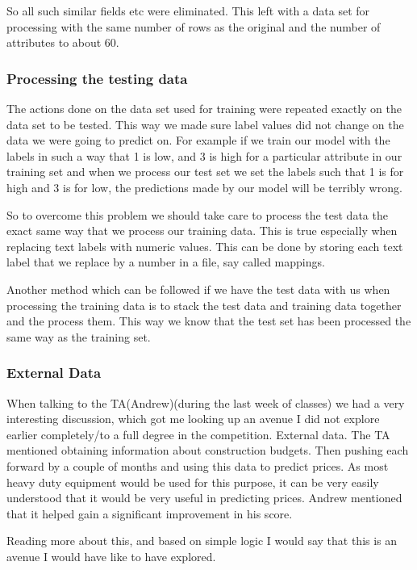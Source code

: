 \documentclass[paper=a4, fontsize=11pt]{scrartcl}	%
\numberwithin{equation}{section}		%
\numberwithin{figure}{section}			%
\numberwithin{table}{section}				%
\begin{document}
So all such similar fields etc were eliminated. This left with a data set for processing with the same number of rows as the original and the number of attributes to about 60.

\subsubsection{Processing the testing data}

The actions done on the data set used for training were repeated exactly on the data set to be tested. This way we made sure label values did not change on the data we were going to predict on. For example if we train our model with the labels in such a way that 1 is low, and 3 is high for a particular attribute in our training set and when we process our test set we set the labels such that 1 is for high and 3 is for low, the predictions made by our model will be terribly wrong.

So to overcome this problem we should take care to process the test data the exact same way that we process our training data. This is true especially when replacing text labels with numeric values. This can be done by storing each text label that we replace by a number in a file, say called mappings.

Another method which can be followed if we have the test data with us when processing the training data is to stack the test data and training data together and the process them. This way we know that the test set has been processed the same way as the training set.

\subsubsection{External Data}

When talking to the TA(Andrew)(during the last week of classes) we had a very interesting discussion, which got me looking up an avenue I did not explore earlier completely/to a full degree in the competition. External data. The TA mentioned obtaining information about construction budgets. Then pushing each forward by a couple of months and using this data to predict prices. As most heavy duty equipment would be used for this purpose, it can be very easily understood that it would be very useful in predicting prices. Andrew mentioned that it helped gain a significant improvement in his score.

Reading more about this, and based on simple logic I would say that this is an avenue I would have like to have explored.
\end{document}
